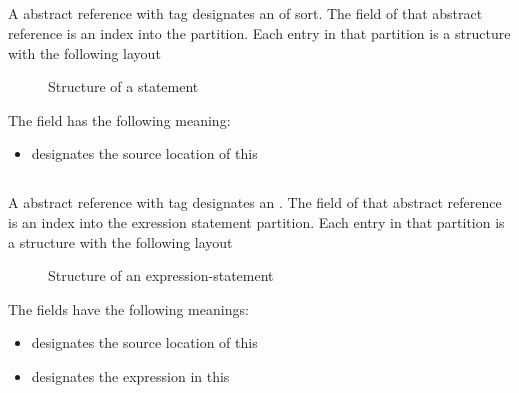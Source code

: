 


\subsection{}
\label{sec:ifc:StmtSort:Continue}

A  abstract reference with tag  designates an  of  sort.
The  field of that abstract reference is an index into the  partition.
Each entry in that partition is a structure with the following layout
%
\begin{figure}[H]
	\centering
	\caption{Structure of a  statement}
	\label{fig:ifc-continue-stmt-structure}
\end{figure}
%
The field has the following meaning:
\begin{itemize}
	\item {} designates the source location of this 
\end{itemize}


\subsection{}
\label{sec:ifc:StmtSort:Expr}

A  abstract reference with tag  designates an .
The  field of that abstract reference is an index into the exression statement partition.
Each entry in that partition is a structure with the following layout
%
\begin{figure}[H]
	\centering
	\caption{Structure of an expression-statement}
	\label{fig:ifc-expr-stmt-structure}
\end{figure}
%
The fields have the following meanings:
\begin{itemize}
	\item {} designates the source location of this 
	\item {} designates the expression in this 
\end{itemize}

